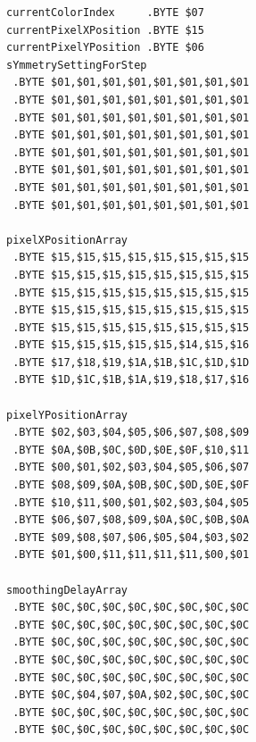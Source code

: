 \begin{minipage}[b]{0.33\linewidth}
\begin{lrbox}{\mybox}
\begin{lstlisting}[basicstyle=\ttfamily\tiny]
currentColorIndex     .BYTE $07
currentPixelXPosition .BYTE $15
currentPixelYPosition .BYTE $06
sYmmetrySettingForStep
 .BYTE $01,$01,$01,$01,$01,$01,$01,$01
 .BYTE $01,$01,$01,$01,$01,$01,$01,$01
 .BYTE $01,$01,$01,$01,$01,$01,$01,$01
 .BYTE $01,$01,$01,$01,$01,$01,$01,$01
 .BYTE $01,$01,$01,$01,$01,$01,$01,$01
 .BYTE $01,$01,$01,$01,$01,$01,$01,$01
 .BYTE $01,$01,$01,$01,$01,$01,$01,$01
 .BYTE $01,$01,$01,$01,$01,$01,$01,$01

pixelXPositionArray   
 .BYTE $15,$15,$15,$15,$15,$15,$15,$15
 .BYTE $15,$15,$15,$15,$15,$15,$15,$15
 .BYTE $15,$15,$15,$15,$15,$15,$15,$15
 .BYTE $15,$15,$15,$15,$15,$15,$15,$15
 .BYTE $15,$15,$15,$15,$15,$15,$15,$15
 .BYTE $15,$15,$15,$15,$15,$14,$15,$16
 .BYTE $17,$18,$19,$1A,$1B,$1C,$1D,$1D
 .BYTE $1D,$1C,$1B,$1A,$19,$18,$17,$16

pixelYPositionArray   
 .BYTE $02,$03,$04,$05,$06,$07,$08,$09
 .BYTE $0A,$0B,$0C,$0D,$0E,$0F,$10,$11
 .BYTE $00,$01,$02,$03,$04,$05,$06,$07
 .BYTE $08,$09,$0A,$0B,$0C,$0D,$0E,$0F
 .BYTE $10,$11,$00,$01,$02,$03,$04,$05
 .BYTE $06,$07,$08,$09,$0A,$0C,$0B,$0A
 .BYTE $09,$08,$07,$06,$05,$04,$03,$02
 .BYTE $01,$00,$11,$11,$11,$11,$00,$01

smoothingDelayArray   
 .BYTE $0C,$0C,$0C,$0C,$0C,$0C,$0C,$0C
 .BYTE $0C,$0C,$0C,$0C,$0C,$0C,$0C,$0C
 .BYTE $0C,$0C,$0C,$0C,$0C,$0C,$0C,$0C
 .BYTE $0C,$0C,$0C,$0C,$0C,$0C,$0C,$0C
 .BYTE $0C,$0C,$0C,$0C,$0C,$0C,$0C,$0C
 .BYTE $0C,$04,$07,$0A,$02,$0C,$0C,$0C
 .BYTE $0C,$0C,$0C,$0C,$0C,$0C,$0C,$0C
 .BYTE $0C,$0C,$0C,$0C,$0C,$0C,$0C,$0C
\end{lstlisting}
\end{lrbox}%
\scalebox{0.8}{\usebox{\mybox}}
\end{minipage}
\hspace{0.5cm}
